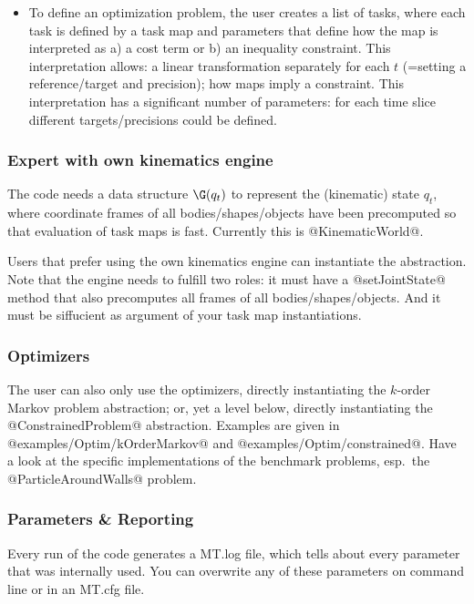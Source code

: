 \documentclass[10pt,fleqn,twoside]{article}
\begin{document}
{{\begin{itemize}
\item To define an optimization problem, the user creates a list of
tasks, where each task is defined by a task map and parameters that
define how the map is interpreted as a) a cost term or b) an inequality
constraint. This interpretation allows: a linear
transformation separately for each $t$ (=setting a reference/target
and precision); how maps imply a constraint. This interpretation has a
significant number of parameters: for each time slice different
targets/precisions could be defined.
\end{itemize}


\subsubsection{Expert with own kinematics engine}

The code needs a data structure $\G(q_t)$ to represent the
(kinematic) state $q_t$, where coordinate frames of all
bodies/shapes/objects have been precomputed so that evaluation of task
maps is fast. Currently this is @KinematicWorld@.

Users that prefer using the own kinematics engine can instantiate the
abstraction. Note that the engine needs to fulfill two roles: it must
have a @setJointState@ method that also precomputes all frames of all
bodies/shapes/objects. And it must be siffucient as argument of your
task map instantiations.

\subsubsection{Optimizers}

The user can also only use the optimizers, directly instantiating the
$k$-order Markov problem abstraction; or, yet a level below, directly
instantiating the @ConstrainedProblem@ abstraction. Examples are given
in @examples/Optim/kOrderMarkov@ and
@examples/Optim/constrained@. Have a look at the specific
implementations of the benchmark problems, esp.\ the
@ParticleAroundWalls@ problem.

\subsubsection{Parameters \& Reporting}

Every run of the code generates a MT.log file, which tells about every
parameter that was internally used. You can overwrite any of these
parameters on command line or in an MT.cfg file.

}}
\end{document}
